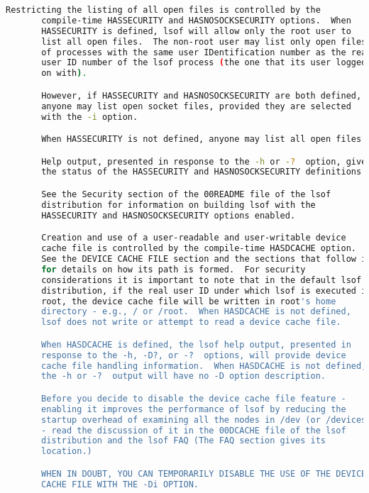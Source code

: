 {{\begin{lstlisting}[language=bash]
       Restricting the listing of all open files is controlled by the
       compile-time HASSECURITY and HASNOSOCKSECURITY options.  When
       HASSECURITY is defined, lsof will allow only the root user to
       list all open files.  The non-root user may list only open files
       of processes with the same user IDentification number as the real
       user ID number of the lsof process (the one that its user logged
       on with).

       However, if HASSECURITY and HASNOSOCKSECURITY are both defined,
       anyone may list open socket files, provided they are selected
       with the -i option.

       When HASSECURITY is not defined, anyone may list all open files.

       Help output, presented in response to the -h or -?  option, gives
       the status of the HASSECURITY and HASNOSOCKSECURITY definitions.

       See the Security section of the 00README file of the lsof
       distribution for information on building lsof with the
       HASSECURITY and HASNOSOCKSECURITY options enabled.

       Creation and use of a user-readable and user-writable device
       cache file is controlled by the compile-time HASDCACHE option.
       See the DEVICE CACHE FILE section and the sections that follow it
       for details on how its path is formed.  For security
       considerations it is important to note that in the default lsof
       distribution, if the real user ID under which lsof is executed is
       root, the device cache file will be written in root's home
       directory - e.g., / or /root.  When HASDCACHE is not defined,
       lsof does not write or attempt to read a device cache file.

       When HASDCACHE is defined, the lsof help output, presented in
       response to the -h, -D?, or -?  options, will provide device
       cache file handling information.  When HASDCACHE is not defined,
       the -h or -?  output will have no -D option description.

       Before you decide to disable the device cache file feature -
       enabling it improves the performance of lsof by reducing the
       startup overhead of examining all the nodes in /dev (or /devices)
       - read the discussion of it in the 00DCACHE file of the lsof
       distribution and the lsof FAQ (The FAQ section gives its
       location.)

       WHEN IN DOUBT, YOU CAN TEMPORARILY DISABLE THE USE OF THE DEVICE
       CACHE FILE WITH THE -Di OPTION.


\end{lstlisting}}}
